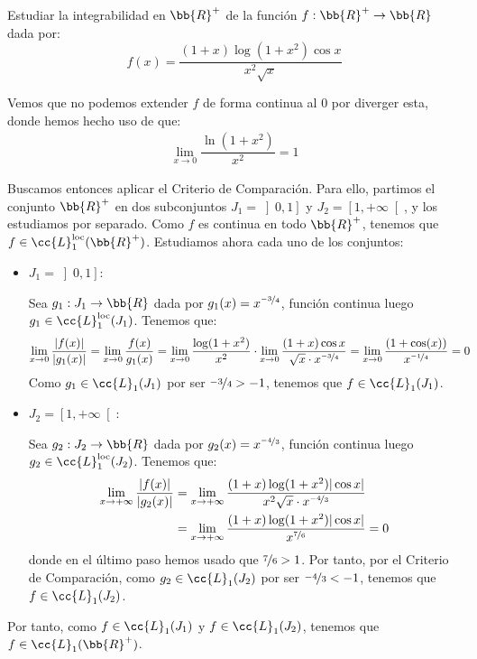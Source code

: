 \begin{ejercicio}
    Estudiar la integrabilidad en $\bb{R}^+$ de la función $f:\bb{R}^+\to \bb{R}$ dada por:
    \begin{equation*}
        f(x) = \dfrac{(1+x)\log(1+x^2)\cos x}{x^2\sqrt{x}}
    \end{equation*}

    Vemos que no podemos extender $f$ de forma continua al $0$ por diverger esta, donde hemos hecho uso de que:
    \begin{align*}
        \lim_{x\to 0} \dfrac{\ln(1+x^2)}{x^2}=1
    \end{align*}

    Buscamos entonces aplicar el Criterio de Comparación. Para ello, partimos el conjunto $\bb{R}^+$ en dos subconjuntos $J_1=\left]0,1\right]$ y $J_2=\left[1,+\infty\right[$, y los estudiamos por separado.
    Como $f$ es continua en todo $\bb{R}^+$, tenemos que $f\in \cc{L}_1^{\text{loc}}(\bb{R}^+)$. Estudiamos ahora cada uno de los conjuntos:
    \begin{itemize}
        \item \ul{$J_1=\left]0,1\right]$}:
        
        Sea $g_1:J_1\to \bb{R}$ dada por $g_1(x)=x^{\nicefrac{-3}{4}}$, función continua luego $g_1\in \cc{L}_1^{\text{loc}}(J_1)$. Tenemos que:
        \begin{align*}
            \lim_{x\to 0} \dfrac{|f(x)|}{|g_1(x)|}
            &= \lim_{x\to 0} \dfrac{f(x)}{g_1(x)}
            = \lim_{x\to 0}\dfrac{\log(1+x^2)}{x^2}\cdot
            \lim_{x\to 0}\dfrac{(1+x)\cos x}{\sqrt{x}\cdot x^{\nicefrac{-3}{4}}}
            = \lim_{x\to 0}\dfrac{(1+\cos(x))}{x^{\nicefrac{-1}{4}}} = 0
        \end{align*}
        Como $g_1\in \cc{L}_1(J_1)$ por ser $\nicefrac{-3}{4}>-1$, tenemos que $f\in \cc{L}_1(J_1)$.

        \item \ul{$J_2=\left[1,+\infty\right[$}:
        
        Sea $g_2:J_2\to \bb{R}$ dada por $g_2(x)=x^{\nicefrac{-4}{3}}$, función continua luego $g_2\in \cc{L}_1^{\text{loc}}(J_2)$. Tenemos que:
        \begin{align*}
            \lim_{x\to +\infty} \dfrac{|f(x)|}{|g_2(x)|}
            &= \lim_{x\to +\infty}\dfrac{(1+x)\log(1+x^2)|\cos x|}{x^2\sqrt{x}\cdot x^{\nicefrac{-4}{3}}}\\
            &= \lim_{x\to +\infty}\dfrac{(1+x)\log(1+x^2)|\cos x|}{x^{\nicefrac{7}{6}}}=0
        \end{align*}
        donde en el último paso hemos usado que $\nicefrac{7}{6}>1$. Por tanto, por el Criterio de Comparación, como $g_2\in \cc{L}_1(J_2)$ por ser $\nicefrac{-4}{3}<-1$, tenemos que $f\in \cc{L}_1(J_2)$.
    \end{itemize}

    Por tanto, como $f\in \cc{L}_1(J_1)$ y $f\in \cc{L}_1(J_2)$, tenemos que $f\in \cc{L}_1(\bb{R}^+)$.
\end{ejercicio}
